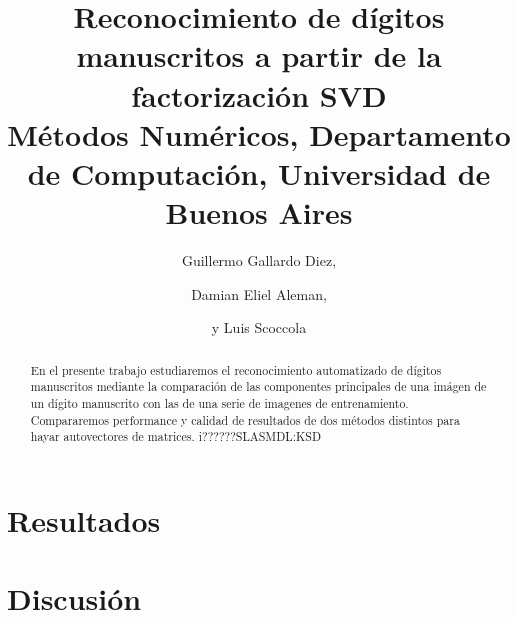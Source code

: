 \documentclass[%
	compressed,
	titlepage,
	narroweqnarray,
	inline,
	twoside,
	]{ieee}
\begin{document}
\title[Reconocimiento de d\'igitos manuscritos]{%
	Reconocimiento de d\'igitos manuscritos a partir de la factorizaci\'on SVD\\
{\small M\'etodos Num\'ericos, Departamento de Computaci\'on, Universidad de Buenos Aires}
}

\author[ALEMAN, G. DIEZ Y SCOCCOLA]{
Guillermo Gallardo Diez,\and{}Damian Eliel Aleman,\and{}y Luis Scoccola
}



\maketitle               
\tableofcontents

\newpage

\begin{abstract} 
	En el presente trabajo estudiaremos el reconocimiento automatizado
	de d\'igitos manuscritos mediante la comparaci\'on de las componentes
	principales de una im\'agen de un d\'igito manuscrito con las de una
	serie de imagenes de entrenamiento.
	Compararemos performance y calidad de resultados de dos m\'etodos
	distintos para hayar autovectores de matrices. i??????SLASMDL:KSD
\end{abstract}

\begin{keywords}
\end{keywords}


 


\section{Resultados}



\section{Discusi\'on}
\end{document}
